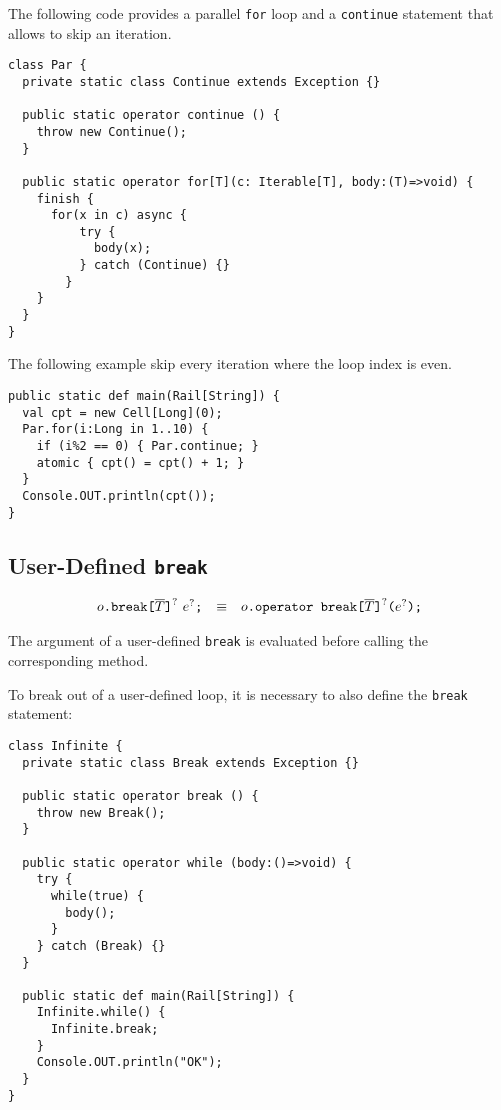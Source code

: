 \begin{example}
  The following code provides a parallel \verb+for+ loop and a
  \verb+continue+ statement that allows to skip an iteration.
\begin{verbatim}
class Par {
  private static class Continue extends Exception {}

  public static operator continue () {
    throw new Continue();
  }

  public static operator for[T](c: Iterable[T], body:(T)=>void) {
    finish {
      for(x in c) async {
          try {
            body(x);
          } catch (Continue) {}
        }
    }
  }
}
\end{verbatim}
  The following example skip every iteration where the loop index is
  even.
\begin{verbatim}
public static def main(Rail[String]) {
  val cpt = new Cell[Long](0);
  Par.for(i:Long in 1..10) {
    if (i%2 == 0) { Par.continue; }
    atomic { cpt() = cpt() + 1; }
  }
  Console.OUT.println(cpt());
}
\end{verbatim}
\end{example}


\subsection{User-Defined \texttt{break}}

$$
\begin{array}{rcl}
  {o}\texttt{.break}\texttt{[}{\overline{T}}\texttt{]}^?~{e}^?\texttt{;}
  & \equiv &
  {o}\texttt{.operator break}\texttt{[}{\overline{T}}\texttt{]}^?\texttt{(}{e}^?\texttt{);}
\end{array}
$$

The argument of a user-defined \verb+break+ is
evaluated before calling the corresponding method.

\begin{example}
  To break out of a user-defined loop, it is necessary to also define
  the \verb+break+ statement:
\begin{verbatim}
class Infinite {
  private static class Break extends Exception {}

  public static operator break () {
    throw new Break();
  }

  public static operator while (body:()=>void) {
    try {
      while(true) {
        body();
      }
    } catch (Break) {}
  }

  public static def main(Rail[String]) {
    Infinite.while() {
      Infinite.break;
    }
    Console.OUT.println("OK");
  }
}
\end{verbatim}
\end{example}

